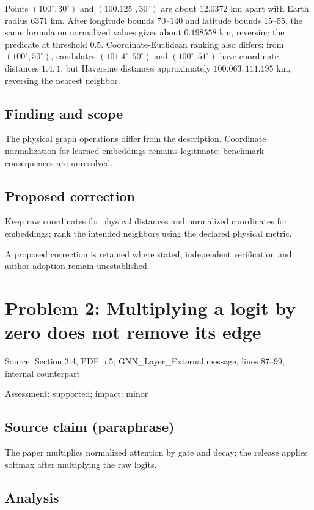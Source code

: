 \documentclass[11pt]{article}
\begin{document}
Points \((100^\circ,30^\circ)\) and \((100.125^\circ,30^\circ)\) are about \(12.0372\) km apart with Earth radius \(6371\) km. After longitude bounds \(70\)–\(140\) and latitude bounds \(15\)–\(55\), the same formula on normalized values gives about \(0.198558\) km, reversing the predicate at threshold \(0.5\). Coordinate-Euclidean ranking also differs: from \((100^\circ,50^\circ)\), candidates \((101.4^\circ,50^\circ)\) and \((100^\circ,51^\circ)\) have coordinate distances \(1.4,1\), but Haversine distances approximately \(100.063,111.195\) km, reversing the nearest neighbor.

\subsection*{Finding and scope}

The physical graph operations differ from the description. Coordinate normalization for learned embeddings remains legitimate; benchmark consequences are unresolved.

\subsection*{Proposed correction}

Keep raw coordinates for physical distances and normalized coordinates for embeddings; rank the intended neighbors using the declared physical metric.

A proposed correction is retained where stated; independent verification and author adoption remain unestablished.

\section*{Problem 2: Multiplying a logit by zero does not remove its edge}

Source: Section 3.4, PDF p.5; GNN\_Layer\_External.message, lines 87–99; internal counterpart

Assessment: supported; impact: minor

\subsection*{Source claim (paraphrase)}

The paper multiplies normalized attention by gate and decay; the release applies softmax after multiplying the raw logits.

\subsection*{Analysis}
\end{document}
